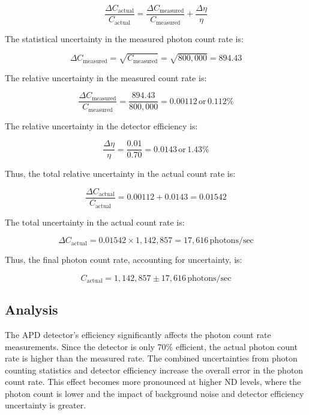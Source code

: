 \documentclass{article}
\numberwithin{equation}{section}
\begin{document}
\[
\frac{\Delta C_{\text{actual}}}{C_{\text{actual}}} = \frac{\Delta C_{\text{measured}}}{C_{\text{measured}}} + \frac{\Delta \eta}{\eta}
\]

The statistical uncertainty in the measured photon count rate is:

\[
\Delta C_{\text{measured}} = \sqrt{C_{\text{measured}}} = \sqrt{800,000} = 894.43
\]

The relative uncertainty in the measured count rate is:

\[
\frac{\Delta C_{\text{measured}}}{C_{\text{measured}}} = \frac{894.43}{800,000} = 0.00112 \, \text{or} \, 0.112\%
\]

The relative uncertainty in the detector efficiency is:

\[
\frac{\Delta \eta}{\eta} = \frac{0.01}{0.70} = 0.0143 \, \text{or} \, 1.43\%
\]

Thus, the total relative uncertainty in the actual count rate is:

\[
\frac{\Delta C_{\text{actual}}}{C_{\text{actual}}} = 0.00112 + 0.0143 = 0.01542
\]

The total uncertainty in the actual count rate is:

\[
\Delta C_{\text{actual}} = 0.01542 \times 1,142,857 = 17,616 \, \text{photons/sec}
\]

Thus, the final photon count rate, accounting for uncertainty, is:

\[
C_{\text{actual}} = 1,142,857 \pm 17,616 \, \text{photons/sec}
\]

\subsection{Analysis}

The APD detector’s efficiency significantly affects the photon count rate measurements. Since the detector is only 70\% efficient, the actual photon count rate is higher than the measured rate. The combined uncertainties from photon counting statistics and detector efficiency increase the overall error in the photon count rate. This effect becomes more pronounced at higher ND levels, where the photon count is lower and the impact of background noise and detector efficiency uncertainty is greater.
\end{document}
